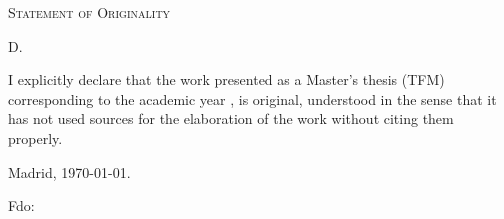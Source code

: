 %

\thispagestyle{empty}

\hfill\vfill

\textsc{Statement of Originality}\\\bigskip

D. \miNombre \\\medskip

 
I explicitly declare that the work presented as a Master's thesis (TFM) corresponding to the academic year \miCurso, is original, understood in the sense that it has not used sources for the elaboration of the work without citing them properly.

\medskip

Madrid, \today.
\begin{flushleft} 
Fdo: \miNombre 

\end{flushleft}

\vfill

\cleardoublepage
\endinput
